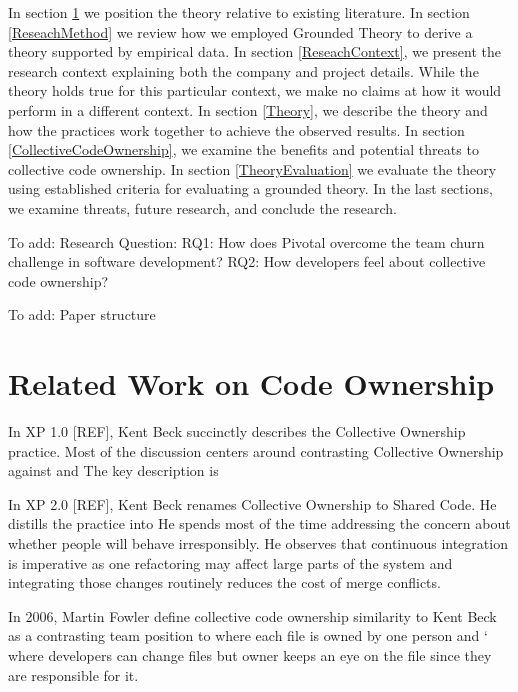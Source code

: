 In section \ref{RelatedWork} we position the theory relative to existing literature. In section \ref{ReseachMethod} we review how we employed Grounded Theory to derive a theory supported by empirical data. In section \ref{ReseachContext}, we present the research context explaining both the company and project details. While the theory holds true for this particular context, we make no claims at how it would perform in a different context. In section \ref{Theory}, we describe the theory and how the practices work together to achieve the observed results. In section \ref{CollectiveCodeOwnership}, we examine the benefits and potential threats to collective code ownership. In section \ref{TheoryEvaluation} we evaluate the theory using established criteria for evaluating a grounded theory. In the last sections, we examine threats, future research, and conclude the research.


To add: 
Research Question:
RQ1: How does Pivotal overcome the team churn challenge in software development?
RQ2: How developers feel about collective code ownership?

To add: 
Paper structure

\section{Related Work on Code Ownership}
\label{RelatedWork}
In XP 1.0 [REF], Kent Beck succinctly describes the Collective Ownership practice. Most of the discussion centers around contrasting Collective Ownership against  and  The key description is 

In XP 2.0 [REF], Kent Beck renames Collective Ownership to Shared Code. He distills the practice into  He spends most of the time addressing the concern about whether people will behave irresponsibly. He observes that continuous integration is imperative as one refactoring may affect large parts of the system and integrating those changes routinely reduces the cost of merge conflicts.

In 2006, Martin Fowler define collective code ownership similarity to Kent Beck \cite{FowlerCodeOwnership} as a contrasting team position to  where each file is owned by one person and ` where developers can change files but owner keeps an eye on the file since they are responsible for it. 

